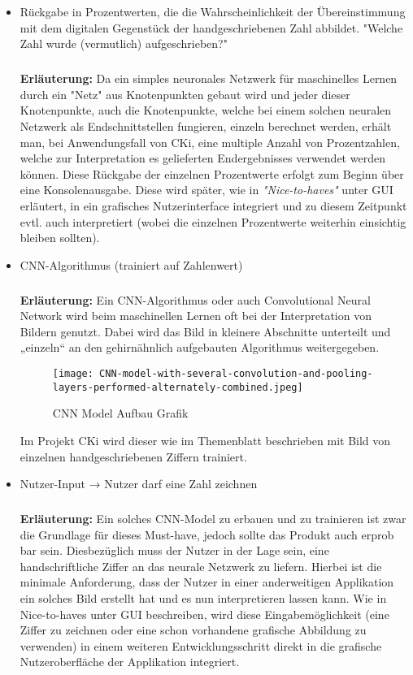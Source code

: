 \begin{itemize}
\item 
Rückgabe in Prozentwerten, die die Wahrscheinlichkeit der Übereinstimmung mit dem digitalen Gegenstück der handgeschriebenen Zahl abbildet. "Welche Zahl wurde (vermutlich) aufgeschrieben?"
\subparagraph{}
\textbf{Erläuterung:}
Da ein simples neuronales Netzwerk für maschinelles Lernen durch ein "Netz" aus Knotenpunkten gebaut wird und jeder dieser Knotenpunkte, auch die Knotenpunkte, welche bei einem solchen neuralen Netzwerk als Endschnittstellen fungieren, einzeln berechnet werden, erhält man, bei Anwendungsfall von CKi, eine multiple Anzahl von Prozentzahlen, welche zur Interpretation es gelieferten Endergebnisses verwendet werden können. Diese Rückgabe der einzelnen Prozentwerte erfolgt zum Beginn über eine Konsolenausgabe. Diese wird später, wie in \textit{"Nice-to-haves"} unter GUI erläutert, in ein grafisches Nutzerinterface integriert und zu diesem Zeitpunkt evtl. auch interpretiert (wobei die einzelnen Prozentwerte weiterhin einsichtig bleiben sollten).

\item CNN-Algorithmus (trainiert auf Zahlenwert)
\subparagraph{}
\textbf{Erläuterung:}
Ein CNN-Algorithmus oder auch Convolutional Neural Network wird beim maschinellen Lernen oft bei der Interpretation von Bildern genutzt. Dabei wird das Bild in kleinere Abschnitte unterteilt und „einzeln“ an den gehirnähnlich aufgebauten Algorithmus weitergegeben.
\begin{figure}[H]
\centering
\texttt{[image: CNN-model-with-several-convolution-and-pooling-layers-performed-alternately-combined.jpeg]}
\caption{CNN Model Aufbau Grafik}
\label{fig:AnalyseCNN-model-with-several-convolution-and-pooling-layers-performed-alternately-combined}
\end{figure}
Im Projekt CKi wird dieser wie im Themenblatt beschrieben mit Bild von einzelnen handgeschriebenen Ziffern trainiert.

\item Nutzer-Input → Nutzer darf eine Zahl zeichnen
\subparagraph{}
\textbf{Erläuterung:}
Ein solches CNN-Model zu erbauen und zu trainieren ist zwar die Grundlage für dieses Must-have, jedoch sollte das Produkt auch erprob bar sein. Diesbezüglich muss der Nutzer in der Lage sein, eine handschriftliche Ziffer an das neurale Netzwerk zu liefern. Hierbei ist die minimale Anforderung, dass der Nutzer in einer anderweitigen Applikation ein solches Bild erstellt hat und es nun interpretieren lassen kann. Wie in Nice-to-haves unter GUI beschreiben, wird diese Eingabemöglichkeit (eine Ziffer zu zeichnen oder eine schon vorhandene grafische Abbildung zu verwenden) in einem weiteren Entwicklungsschritt direkt in die grafische Nutzeroberfläche der Applikation integriert.

\end{itemize}

